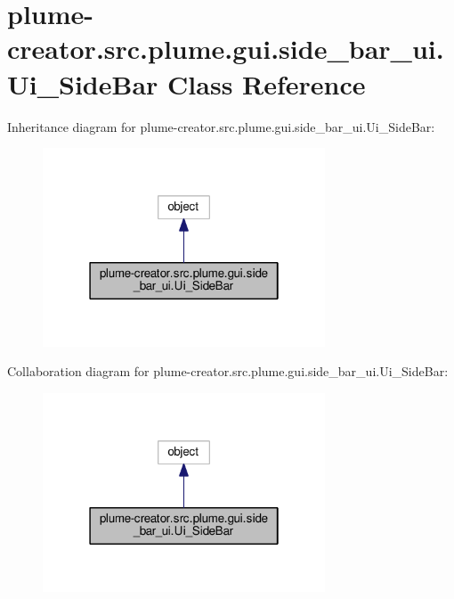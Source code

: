\hypertarget{classplume-creator_1_1src_1_1plume_1_1gui_1_1side__bar__ui_1_1_ui___side_bar}{}\section{plume-\/creator.src.\+plume.\+gui.\+side\+\_\+bar\+\_\+ui.\+Ui\+\_\+\+Side\+Bar Class Reference}
\label{classplume-creator_1_1src_1_1plume_1_1gui_1_1side__bar__ui_1_1_ui___side_bar}


Inheritance diagram for plume-\/creator.src.\+plume.\+gui.\+side\+\_\+bar\+\_\+ui.\+Ui\+\_\+\+Side\+Bar\+:\nopagebreak
\begin{figure}[H]
\begin{center}
\leavevmode
\includegraphics[width=238pt]{classplume-creator_1_1src_1_1plume_1_1gui_1_1side__bar__ui_1_1_ui___side_bar__inherit__graph}
\end{center}
\end{figure}


Collaboration diagram for plume-\/creator.src.\+plume.\+gui.\+side\+\_\+bar\+\_\+ui.\+Ui\+\_\+\+Side\+Bar\+:\nopagebreak
\begin{figure}[H]
\begin{center}
\leavevmode
\includegraphics[width=238pt]{classplume-creator_1_1src_1_1plume_1_1gui_1_1side__bar__ui_1_1_ui___side_bar__coll__graph}
\end{center}
\end{figure}

